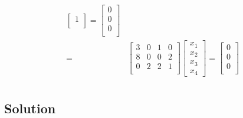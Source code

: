 \documentclass{article}
\begin{document}
\begin{align*}
\begin{bmatrix}
    \text{1} \\
\end{bmatrix}
= \begin{bmatrix}
    \text{0} \\
    \text{0} \\
    \text{0} \\
\end{bmatrix} \\
=
&\begin{bmatrix}
    3 & 0 & 1 & 0 \\
    8 & 0 & 0 & 2 \\
    0 & 2 & 2 & 1 \\
\end{bmatrix}
\begin{bmatrix}
    x_1 \\
    x_2 \\
    x_3 \\
    x_4 
\end{bmatrix}
= \begin{bmatrix}
    \text{0} \\
    \text{0} \\
    \text{0} \\
\end{bmatrix} \\
\end{align*}

\newpage

\subsection*{Solution}
\end{document}
